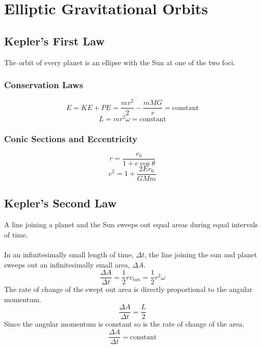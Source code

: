 \section{Elliptic Gravitational Orbits}
\subsection{Kepler's First Law}
The orbit of every planet is an ellipse with the Sun at one of the two foci.
\subsubsection{Conservation Laws}
$$E=KE+PE=\frac{mv^2}{2}-\frac{mMG}{r}=\text{constant}$$
$$L=mr^2\omega=\text{constant}$$
\subsubsection{Conic Sections and Eccentricity}
$$r=\frac{r_0}{1+e\cos{\theta}}$$
$$e^2=1+\frac{2Er_0}{GMm}$$
\vspace{1cm}

\subsection{Kepler's Second Law}
A line joining a planet and the Sun sweeps out equal areas during equal intervals of time.\\ \ \\

In an infinitesimally small length of time, $\Delta t$, the line joining the sun and planet sweeps out an infinitesimally small area, $\Delta A$.
$$\frac{\Delta A}{\Delta t}=\frac{1}{2}r v_{tan}=\frac{1}{2}r^2\omega$$
The rate of change of the swept out area is directly proportional to the angular momentum.
$$\frac{\Delta A}{\Delta t}=\frac{L}{2}$$
Since the angular momentum is constant so is the rate of change of the area.
$$\frac{\Delta A}{\Delta t}=\text{constant}$$

